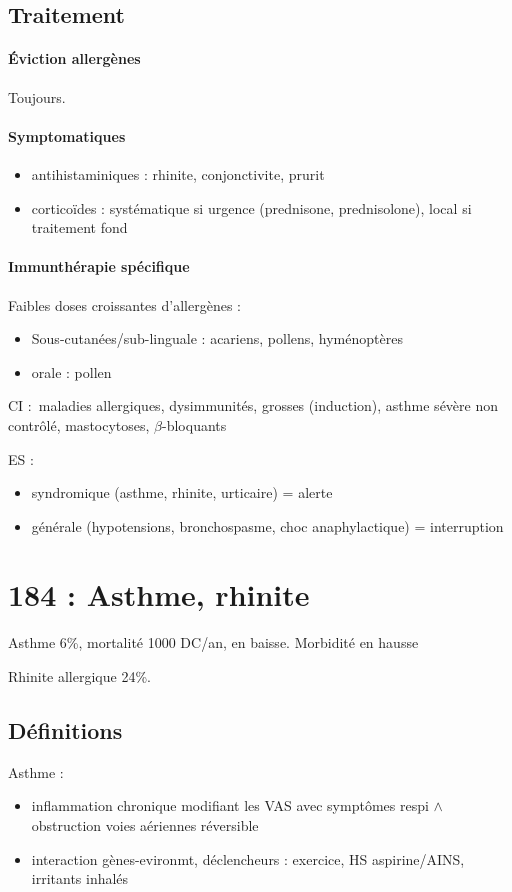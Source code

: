 \documentclass{article}
\begin{document}
\subsection{Traitement}
\paragraph{Éviction allergènes} Toujours.

\paragraph{Symptomatiques}
\begin{itemize}
\item antihistaminiques : rhinite, conjonctivite, prurit
\item corticoïdes : systématique si urgence (prednisone, prednisolone), local
  si traitement fond
\end{itemize}

\paragraph{Immunthérapie spécifique}
Faibles doses croissantes d'allergènes :
\begin{itemize}
\item Sous-cutanées/sub-linguale : acariens, pollens, hyménoptères
\item orale : pollen
\end{itemize}
CI : maladies allergiques, dysimmunités, grosses (induction), asthme sévère non
contrôlé, mastocytoses, $\beta$-bloquants

ES : 
\begin{itemize}
\item syndromique (asthme, rhinite, urticaire) = alerte
\item générale (hypotensions, bronchospasme, choc anaphylactique) =
  interruption
\end{itemize}


\section{184 : Asthme, rhinite}
Asthme 6\%, mortalité 1000 DC/an, en baisse. Morbidité en hausse

Rhinite allergique 24\%.
\subsection{Définitions}
Asthme : 
\begin{itemize}
\item inflammation chronique modifiant les VAS avec symptômes respi \(\wedge\) obstruction voies aériennes réversible
\item interaction gènes-evironmt, déclencheurs : exercice, HS aspirine/AINS,
  irritants inhalés
\end{itemize}
\end{document}
